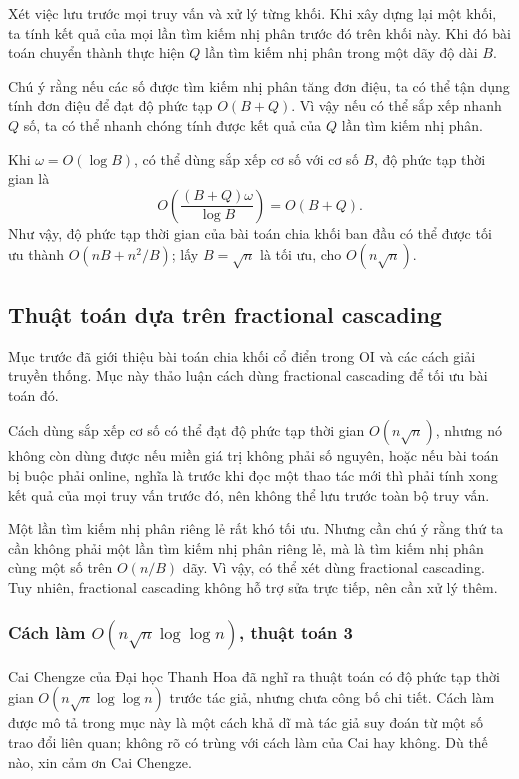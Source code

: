 \documentclass[11pt]{article}
\begin{document}
Xét việc lưu trước mọi truy vấn và xử lý từng khối. Khi xây dựng lại một khối,
ta tính kết quả của mọi lần tìm kiếm nhị phân trước đó trên khối này. Khi đó
bài toán chuyển thành thực hiện $Q$ lần tìm kiếm nhị phân trong một dãy độ dài
$B$.

Chú ý rằng nếu các số được tìm kiếm nhị phân tăng đơn điệu, ta có thể tận dụng
tính đơn điệu để đạt độ phức tạp $O(B+Q)$. Vì vậy nếu có thể sắp xếp nhanh
$Q$ số, ta có thể nhanh chóng tính được kết quả của $Q$ lần tìm kiếm nhị phân.

Khi $\omega=O(\log B)$, có thể dùng sắp xếp cơ số với cơ số $B$, độ phức tạp
thời gian là
\[
O\left(\frac{(B+Q)\omega}{\log B}\right)=O(B+Q).
\]
Như vậy, độ phức tạp thời gian của bài toán chia khối ban đầu có thể được tối
ưu thành $O(nB+n^2/B)$; lấy $B=\sqrt n$ là tối ưu, cho $O(n\sqrt n)$.

\subsection{Thuật toán dựa trên fractional cascading}

Mục trước đã giới thiệu bài toán chia khối cổ điển trong OI và các cách giải
truyền thống. Mục này thảo luận cách dùng fractional cascading để tối ưu bài
toán đó.

Cách dùng sắp xếp cơ số có thể đạt độ phức tạp thời gian $O(n\sqrt n)$, nhưng
nó không còn dùng được nếu miền giá trị không phải số nguyên, hoặc nếu bài toán
bị buộc phải online, nghĩa là trước khi đọc một thao tác mới thì phải tính xong
kết quả của mọi truy vấn trước đó, nên không thể lưu trước toàn bộ truy vấn.

Một lần tìm kiếm nhị phân riêng lẻ rất khó tối ưu. Nhưng cần chú ý rằng thứ ta
cần không phải một lần tìm kiếm nhị phân riêng lẻ, mà là tìm kiếm nhị phân cùng
một số trên $O(n/B)$ dãy. Vì vậy, có thể xét dùng fractional cascading. Tuy
nhiên, fractional cascading không hỗ trợ sửa trực tiếp, nên cần xử lý thêm.

\subsubsection{Cách làm \texorpdfstring{$O(n\sqrt n\log\log n)$}{O(n sqrt(n) log log n)}, thuật toán 3}

Cai Chengze của Đại học Thanh Hoa đã nghĩ ra thuật toán có độ phức tạp thời
gian $O(n\sqrt n\log\log n)$ trước tác giả, nhưng chưa công bố chi tiết. Cách
làm được mô tả trong mục này là một cách khả dĩ mà tác giả suy đoán từ một số
trao đổi liên quan; không rõ có trùng với cách làm của Cai hay không. Dù thế
nào, xin cảm ơn Cai Chengze.
\end{document}
